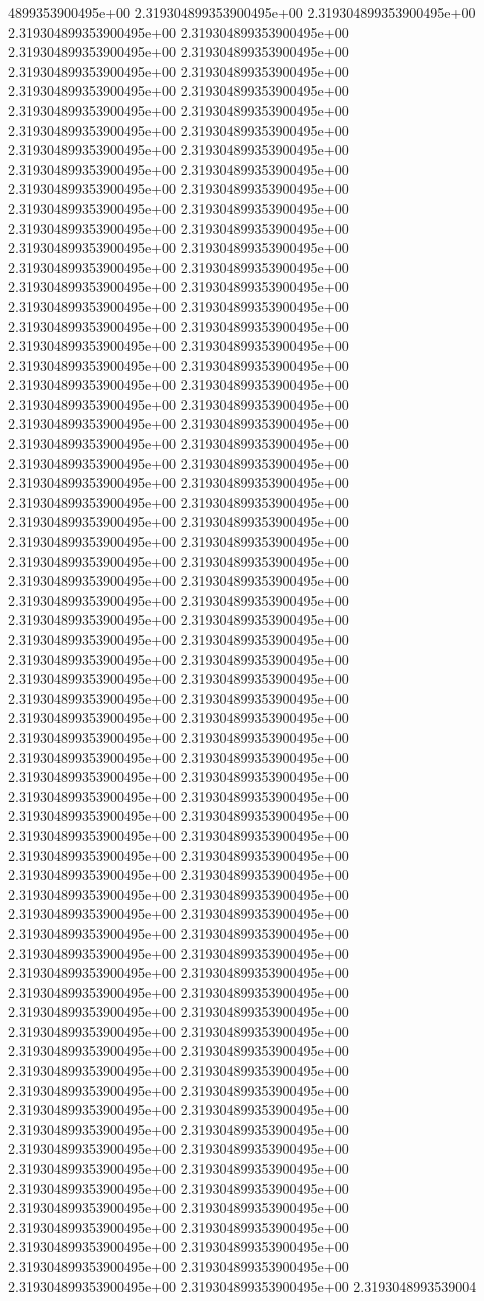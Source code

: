 4899353900495e+00	2.319304899353900495e+00	2.319304899353900495e+00	2.319304899353900495e+00	2.319304899353900495e+00	2.319304899353900495e+00	2.319304899353900495e+00	2.319304899353900495e+00	2.319304899353900495e+00	2.319304899353900495e+00	2.319304899353900495e+00	2.319304899353900495e+00	2.319304899353900495e+00	2.319304899353900495e+00	2.319304899353900495e+00	2.319304899353900495e+00	2.319304899353900495e+00	2.319304899353900495e+00	2.319304899353900495e+00	2.319304899353900495e+00	2.319304899353900495e+00	2.319304899353900495e+00	2.319304899353900495e+00	2.319304899353900495e+00	2.319304899353900495e+00	2.319304899353900495e+00	2.319304899353900495e+00	2.319304899353900495e+00	2.319304899353900495e+00	2.319304899353900495e+00	2.319304899353900495e+00	2.319304899353900495e+00	2.319304899353900495e+00	2.319304899353900495e+00	2.319304899353900495e+00	2.319304899353900495e+00	2.319304899353900495e+00	2.319304899353900495e+00	2.319304899353900495e+00	2.319304899353900495e+00	2.319304899353900495e+00	2.319304899353900495e+00	2.319304899353900495e+00	2.319304899353900495e+00	2.319304899353900495e+00	2.319304899353900495e+00	2.319304899353900495e+00	2.319304899353900495e+00	2.319304899353900495e+00	2.319304899353900495e+00	2.319304899353900495e+00	2.319304899353900495e+00	2.319304899353900495e+00	2.319304899353900495e+00	2.319304899353900495e+00	2.319304899353900495e+00	2.319304899353900495e+00	2.319304899353900495e+00	2.319304899353900495e+00	2.319304899353900495e+00	2.319304899353900495e+00	2.319304899353900495e+00	2.319304899353900495e+00	2.319304899353900495e+00	2.319304899353900495e+00	2.319304899353900495e+00	2.319304899353900495e+00	2.319304899353900495e+00	2.319304899353900495e+00	2.319304899353900495e+00	2.319304899353900495e+00	2.319304899353900495e+00	2.319304899353900495e+00	2.319304899353900495e+00	2.319304899353900495e+00	2.319304899353900495e+00	2.319304899353900495e+00	2.319304899353900495e+00	2.319304899353900495e+00	2.319304899353900495e+00	2.319304899353900495e+00	2.319304899353900495e+00	2.319304899353900495e+00	2.319304899353900495e+00	2.319304899353900495e+00	2.319304899353900495e+00	2.319304899353900495e+00	2.319304899353900495e+00	2.319304899353900495e+00	2.319304899353900495e+00	2.319304899353900495e+00	2.319304899353900495e+00	2.319304899353900495e+00	2.319304899353900495e+00	2.319304899353900495e+00	2.319304899353900495e+00	2.319304899353900495e+00	2.319304899353900495e+00	2.319304899353900495e+00	2.319304899353900495e+00	2.319304899353900495e+00	2.319304899353900495e+00	2.319304899353900495e+00	2.319304899353900495e+00	2.319304899353900495e+00	2.319304899353900495e+00	2.319304899353900495e+00	2.319304899353900495e+00	2.319304899353900495e+00	2.319304899353900495e+00	2.319304899353900495e+00	2.319304899353900495e+00	2.319304899353900495e+00	2.319304899353900495e+00	2.319304899353900495e+00	2.319304899353900495e+00	2.319304899353900495e+00	2.319304899353900495e+00	2.319304899353900495e+00	2.319304899353900495e+00	2.319304899353900495e+00	2.319304899353900495e+00	2.319304899353900495e+00	2.319304899353900495e+00	2.319304899353900495e+00	2.319304899353900495e+00	2.319304899353900495e+00	2.319304899353900495e+00	2.319304899353900495e+00	2.319304899353900495e+00	2.319304899353900495e+00	2.319304899353900495e+00	2.319304899353900495e+00	2.3193048993539004
